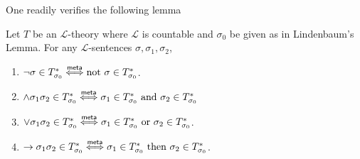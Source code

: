 One readily verifies the following lemma
\begin{lemma}\label{SentencesInMaximalExtensionBehaveLikeValidSentencesInAModel}
    Let $T$ be an $\mathcal{L}$-theory where $\mathcal{L}$ is countable and $\sigma_0$ be given as in Lindenbaum's Lemma. For any $\mathcal{L}$-sentences $\sigma,\sigma_1,\sigma_2$,
    \begin{enumerate}
        \item $\neg \sigma\in T^\ast_{\sigma_0}\mathrel{\overset{\mathsf{meta}}{\Longleftrightarrow}} \text{not } \sigma\in T^\ast_{\sigma_0}$.
        \item $\wedge \sigma_1\sigma_2\in T^\ast_{\sigma_0} \mathrel{\overset{\mathsf{meta}}{\Longleftrightarrow}} \sigma_1\in T^\ast_{\sigma_0}\text{ and }\sigma_2\in T^\ast_{\sigma_0}$
        \item $\vee\sigma_1\sigma_2 \in T^\ast_{\sigma_0} \mathrel{\overset{\mathsf{meta}}{\Longleftrightarrow}} \sigma_1\in T^\ast_{\sigma_0} \text{ or } \sigma_2\in T^\ast_{\sigma_0}$.
        \item $\to\sigma_1\sigma_2\in T^\ast_{\sigma_0} \mathrel{\overset{\mathsf{meta}}{\Longleftrightarrow}} \sigma_1\in T^\ast_{\sigma_0} \text{ then } \sigma_2\in T^\ast_{\sigma_0}$.
    \end{enumerate}
\end{lemma}
